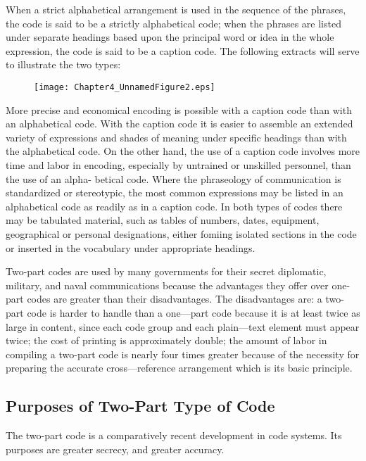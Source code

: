 \mypara When a strict alphabetical arrangement is used in the sequence of
the phrases, the code is said to be a strictly alphabetical code; when the
phrases are listed under separate headings based upon the principal word
or idea in the whole expression, the code is said to be a caption code. The
following extracts will serve to illustrate the two types:

\begin{figure}[h]
   \centering
    \texttt{[image: Chapter4\_UnnamedFigure2.eps]}
\end{figure}

\mypara More precise and economical encoding is possible with a caption
code than with an alphabetical code. With the caption code it is easier
to assemble an extended variety of expressions and shades of meaning
under speciﬁc headings than with the alphabetical code. On the other
hand, the use of a caption code involves more time and labor in encoding,
especially by untrained or unskilled personnel, than the use of an alpha-
betical code. Where the phraseology of communication is standardized or
stereotypic, the most common expressions may be listed in an alphabetical
code as readily as in a caption code. In both types of codes there may be
tabulated material, such as tables of numbers, dates, equipment, geographical or personal designations, either fomiing isolated sections in
the code or inserted in the vocabulary under appropriate headings.

\mypara Two-part codes are used by many governments for their secret
diplomatic, military, and naval communications because the advantages
they offer over one-part codes are greater than their disadvantages. The
disadvantages are: a two-part code is harder to handle than a one—part
code because it is at least twice as large in content, since each code group
and each plain—text element must appear twice; the cost of printing is
approximately double; the amount of labor in compiling a two-part code
is nearly four times greater because of the necessity for preparing the
accurate cross—reference arrangement which is its basic principle.

\subsection{Purposes of Two-Part Type of Code}

\mypara The two-part code is a comparatively recent development in code
systems. Its purposes are greater secrecy, and greater accuracy.

